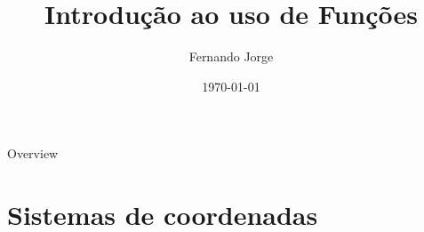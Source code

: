 \documentclass[aspectratio=169,xcolor=dvipsnames]{beamer}
\title[short title]{Introdução ao uso de Funções} %
\author[Fernando-Jorge] {Fernando Jorge}
\institute[NTU] %
{
  Escola Estadual Professor Lima Castro
}
\date{\today} %
\begin{document}
\begin{frame}
    \titlepage
\end{frame}

\begin{frame}{Overview}
    \tableofcontents
\end{frame}

\section{Sistemas de coordenadas}
\end{document}
